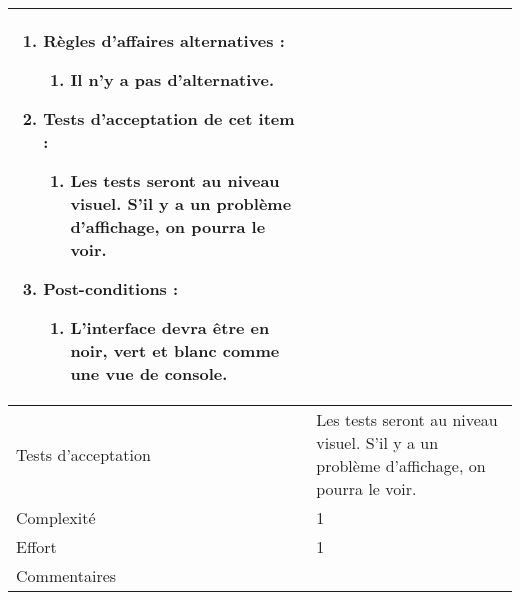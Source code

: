 \begin{longtable}{|l|p{}|}
\begin{enumerate}[label*=\arabic*.]
\begin{enumerate}[label*=\arabic*.]
                                \item Règles d'affaires alternatives :
                                \begin{enumerate}[label*=\arabic*.]
                                    \item Il n'y a pas d'alternative.
                                \end{enumerate}
                                \item Tests d'acceptation de cet item :
                                \begin{enumerate}[label*=\arabic*.]
                                    \item Les tests seront au niveau visuel. S'il y a un problème d'affichage, on pourra le voir.
                                \end{enumerate}
                                \item Post-conditions :
                                \begin{enumerate}[label*=\arabic*.]
                                    \item L'interface devra être en noir, vert et blanc comme une vue de console.
                                \end{enumerate}
                            \end{enumerate}                
        \end{enumerate} \\
\hline
    Tests d'acceptation & Les tests seront au niveau visuel. S'il y a un problème d'affichage, on pourra le voir. \\
\hline
    Complexité & 1 \\
\hline
    Effort & 1 \\
\hline
    Commentaires &  \\


\end{longtable}

